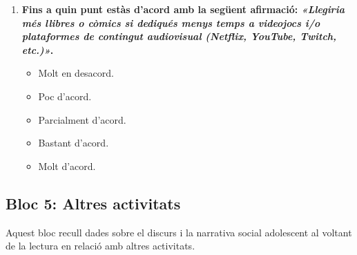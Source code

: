 \documentclass[12pt]{article}
\newcommand{\subsectiononumber}[1]{%
  \subsection*{#1}
  \phantomsection
}
\begin{document}
\begin{enumerate}
    \item \textbf{Fins a quin punt estàs d'acord amb la següent afirmació: \textit{«Llegiria més llibres o còmics si dediqués menys temps a videojocs i/o plataformes de contingut audiovisual (Netflix, YouTube, Twitch, etc.)»}.}
    \begin{itemize}
        \item[$\square$] Molt en desacord.
        \item[$\square$] Poc d'acord.
        \item[$\square$] Parcialment d'acord.
        \item[$\square$] Bastant d'acord.
        \item[$\square$] Molt d'acord.
    \end{itemize}
\end{enumerate}

\subsectiononumber{Bloc 5: Altres activitats}
Aquest bloc recull dades sobre el discurs i la narrativa social adolescent al voltant de la lectura en relació amb altres activitats.
\end{document}
